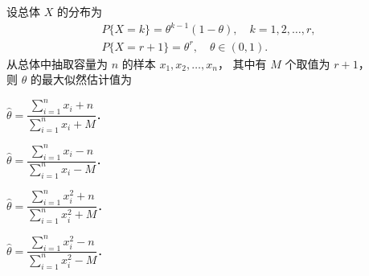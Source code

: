 \begin{question}[index=10]
设总体 $X$ 的分布为
\[
\begin{gathered}
P\{X=k\}=\theta^{k-1}(1-\theta),\quad k=1,2,\ldots,r,\\
P\{X=r+1\}=\theta^r,\quad \theta\in(0,1).
\end{gathered}
\]
从总体中抽取容量为 $n$ 的样本 $x_1,x_2,\ldots,x_n$，
其中有 $M$ 个取值为 $r+1$，\\
则 $\theta$ 的最大似然估计值为
\begin{choices}[columns=2,label-pos=left]
\item $\hat\theta=\dfrac{\displaystyle\sum_{i=1}^n x_i+n}{\displaystyle\sum_{i=1}^n x_i+M}$．
\item $\hat\theta=\dfrac{\displaystyle\sum_{i=1}^n x_i-n}{\displaystyle\sum_{i=1}^n x_i-M}$．
\item $\hat\theta=\dfrac{\displaystyle\sum_{i=1}^n x_i^2+n}{\displaystyle\sum_{i=1}^n x_i^2+M}$．
\item $\hat\theta=\dfrac{\displaystyle\sum_{i=1}^n x_i^2-n}{\displaystyle\sum_{i=1}^n x_i^2-M}$．
\end{choices}
\end{question}
\QuestionBreak
